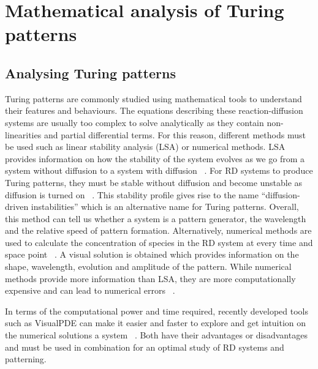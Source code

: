 

%
\section{Mathematical analysis of Turing patterns}

\subsection{Analysing Turing patterns}
Turing patterns are commonly studied using mathematical tools to understand their features and behaviours.
The equations describing these reaction-diffusion systems are usually too complex to solve analytically as they contain non-linearities and partial differential terms.
For this reason, different methods must be used such as linear stability analysis (LSA) or numerical methods.
LSA provides information on how the stability of the system evolves as we go from a system without diffusion to a system with diffusion ~\parencite{Glendinning1994}.
For RD systems to produce Turing patterns, they must be stable without diffusion and become unstable as diffusion is turned on ~\parencite{J.DMurray2002}.
This stability profile gives rise to the name “diffusion-driven instabilities” which is an alternative name for Turing patterns.
Overall, this method can tell us whether a system is a pattern generator, the wavelength and the relative speed of pattern formation.
Alternatively, numerical methods are used to calculate the concentration of species in the RD system at every time and space point ~\parencite{Ramos1983}.
A visual solution is obtained which provides information on the shape, wavelength, evolution and amplitude of the pattern.
While numerical methods provide more information than LSA, they are more computationally expensive and can lead to numerical errors ~\parencite{J.DMurray2002}.

In terms of the computational power and time required, recently developed tools such as VisualPDE can make it easier and faster to explore and get intuition on the numerical solutions a system ~\parencite{Walker2023}.
Both have their advantages or disadvantages and must be used in combination for an optimal study of RD systems and patterning.
